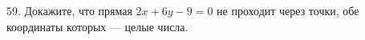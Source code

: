 59. Докажите, что прямая $2x+6y-9=0$ не проходит через точки, обе координаты которых --- целые числа.\\
